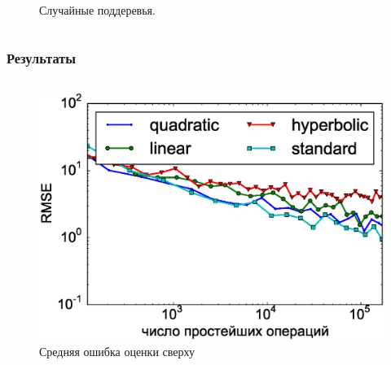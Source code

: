 \documentclass[unicode, notheorems]{beamer}
\begin{document}
\begin{frame}
\begin{columns}
\begin{column}{0.5\textwidth}
\begin{figure}[h]
                \caption{Случайные поддеревья.}
                \label{fig:random_subtree_modified_ev}
            \end{figure}
        \end{column}
        
    \end{columns}
\end{frame}

\begin{frame}
    \frametitle{Результаты}
    \begin{columns}
        \begin{column}{0.5\textwidth}
            \begin{figure}[h]
                \centering
                \includegraphics[width=\linewidth]{rmse_over_nop_upper_slides}
                \caption{Средняя ошибка оценки сверху}
                \label{fig:rmse_over_nop_standard_slides}

\end{figure}
\end{column}
\end{columns}
\end{frame}
\end{document}
